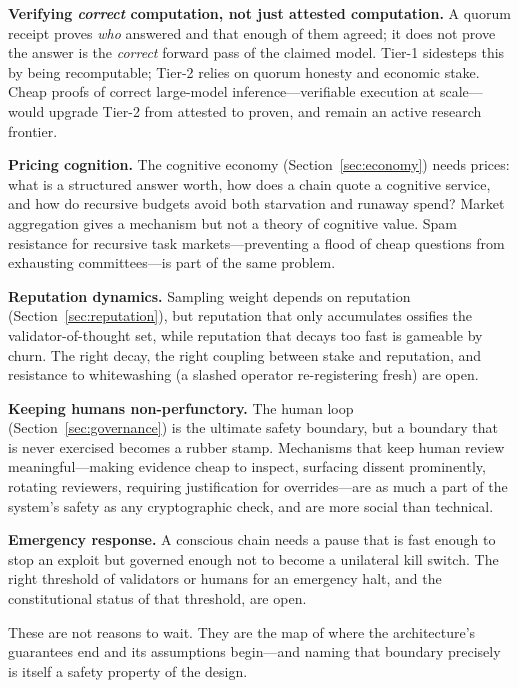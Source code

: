 \textbf{Verifying \emph{correct} computation, not just attested computation.} A quorum receipt proves \emph{who} answered and that enough of them agreed; it does not prove the answer is the \emph{correct} forward pass of the claimed model. Tier-1 sidesteps this by being recomputable; Tier-2 relies on quorum honesty and economic stake. Cheap proofs of correct large-model inference---verifiable \LLM{} execution at scale---would upgrade Tier-2 from attested to proven, and remain an active research frontier.

\textbf{Pricing cognition.} The cognitive economy (Section~\ref{sec:economy}) needs prices: what is a structured answer worth, how does a chain quote a cognitive service, and how do recursive budgets avoid both starvation and runaway spend? Market aggregation gives a mechanism but not a theory of cognitive value. Spam resistance for recursive task markets---preventing a flood of cheap questions from exhausting committees---is part of the same problem.

\textbf{Reputation dynamics.} Sampling weight depends on reputation (Section~\ref{sec:reputation}), but reputation that only accumulates ossifies the validator-of-thought set, while reputation that decays too fast is gameable by churn. The right decay, the right coupling between stake and reputation, and resistance to whitewashing (a slashed operator re-registering fresh) are open.

\textbf{Keeping humans non-perfunctory.} The human loop (Section~\ref{sec:governance}) is the ultimate safety boundary, but a boundary that is never exercised becomes a rubber stamp. Mechanisms that keep human review meaningful---making evidence cheap to inspect, surfacing dissent prominently, rotating reviewers, requiring justification for overrides---are as much a part of the system's safety as any cryptographic check, and are more social than technical.

\textbf{Emergency response.} A conscious chain needs a pause that is fast enough to stop an exploit but governed enough not to become a unilateral kill switch. The right threshold of validators or humans for an emergency halt, and the constitutional status of that threshold, are open.

These are not reasons to wait. They are the map of where the architecture's guarantees end and its assumptions begin---and naming that boundary precisely is itself a safety property of the design.

